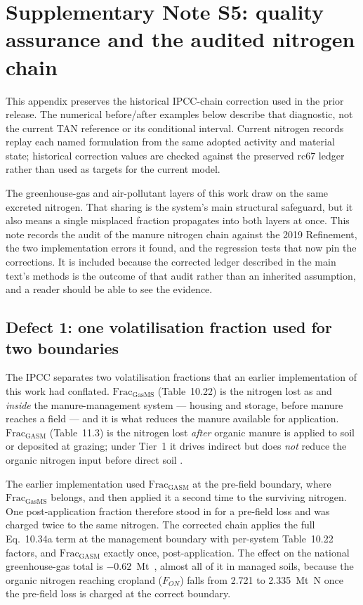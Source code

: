 \section{Supplementary Note S5: quality assurance and the audited nitrogen chain}
\label{sec:s5}

This appendix preserves the historical IPCC-chain correction used in the prior
release. The numerical before/after examples below describe that diagnostic,
not the current TAN reference or its conditional interval. Current nitrogen
records replay each named formulation from the same adopted activity and material
state; historical correction values are checked against the preserved rc67
ledger rather than used as targets for the current model.

The greenhouse-gas and air-pollutant layers of this work draw on the same excreted
nitrogen. That sharing is the system's main structural safeguard, but it also means a
single misplaced fraction propagates into both layers at once. This note records the audit
of the manure nitrogen chain against the 2019 Refinement, the two implementation errors it
found, and the regression tests that now pin the corrections. It is included because the
corrected ledger described in the main text's methods is the outcome of that audit rather
than an inherited assumption, and a reader should be able to see the evidence.

\subsection*{Defect 1: one volatilisation fraction used for two boundaries}

The IPCC separates two volatilisation fractions that an earlier implementation of this
work had conflated. $\mathrm{Frac_{GasMS}}$ (Table~10.22) is the nitrogen lost as
\NHthree{} and \NOx{} \emph{inside} the manure-management system --- housing and storage,
before manure reaches a field --- and it is what reduces the manure available for
application. $\mathrm{Frac_{GASM}}$ (Table~11.3) is the nitrogen lost \emph{after} organic
manure is applied to soil or deposited at grazing; under Tier~1 it drives indirect
\NtwoO{} but does \emph{not} reduce the organic nitrogen input before direct soil
\NtwoO{}.

The earlier implementation used $\mathrm{Frac_{GASM}}$ at the pre-field boundary, where
$\mathrm{Frac_{GasMS}}$ belongs, and then applied it a second time to the surviving
nitrogen. One post-application fraction therefore stood in for a pre-field loss and was
charged twice to the same nitrogen. The corrected chain applies the full Eq.~10.34a term
at the management boundary with per-system Table~10.22 factors, and
$\mathrm{Frac_{GASM}}$ exactly once, post-application. The effect on the national
greenhouse-gas total is $-0.62$~Mt~\COe{}, almost all of it in managed soils, because the
organic nitrogen reaching cropland ($F_{ON}$) falls from \SI{2.721}{} to
\SI{2.335}{}~Mt~N once the pre-field loss is charged at the correct boundary.

